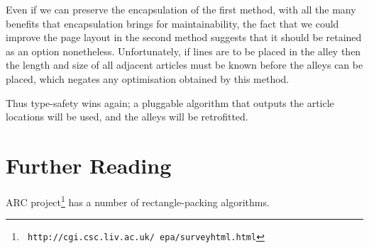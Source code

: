 \documentclass[a4paper]{scrartcl}
\begin{document}
Even if we can preserve the encapsulation of the first method, with
all the many benefits that encapsulation brings for maintainability,
the fact that we could improve the page layout in the second method
suggests that it should be retained as an option
nonetheless. Unfortunately, if lines are to be placed in the alley
then the length and size of all adjacent articles must be known before
the alleys can be placed, which negates any optimisation obtained by
this method.

Thus type-safety wins again; a pluggable algorithm that outputs the
article locations will be used, and the alleys will be retrofitted.

\section*{Further Reading}

ARC project\footnote{\texttt{\tiny
    http://cgi.csc.liv.ac.uk/~epa/surveyhtml.html}} has a number of
rectangle-packing algorithms.
\end{document}
